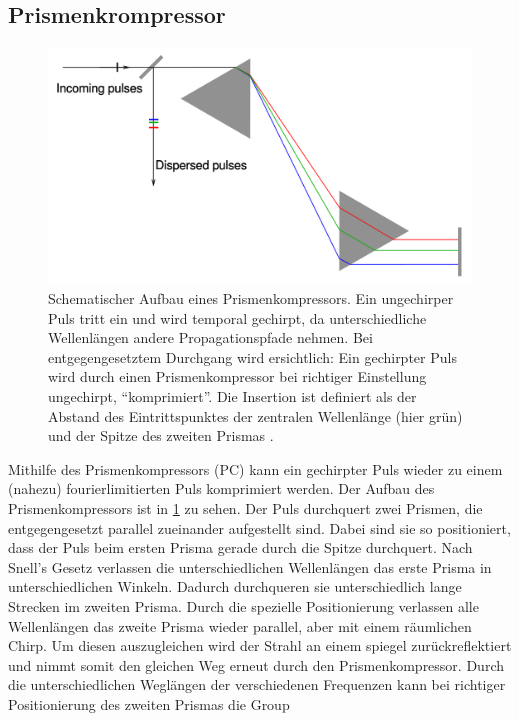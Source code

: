 \documentclass[twoside,        %
               BCOR12mm,       %
               english,ngerman, %
               fleqn,headsepline=false,footsepline=false
              ]{Vorlage/MFPREPORT}
\begin{document}
\subsection{Prismenkrompressor}
\begin{figure}[]
    \centering
    \includegraphics[width=\textwidth]{pc.png}
    \caption{Schematischer Aufbau eines Prismenkompressors. Ein ungechirper
    Puls tritt ein und wird temporal gechirpt, da unterschiedliche Wellenlängen
    andere Propagationspfade nehmen. Bei entgegengesetztem Durchgang wird
    ersichtlich: Ein gechirpter Puls wird durch einen Prismenkompressor bei
    richtiger Einstellung ungechirpt, ``komprimiert''. Die Insertion ist definiert als der
    Abstand des Eintrittspunktes der zentralen Wellenlänge (hier grün) und der
    Spitze des zweiten Prismas .\cite{wikipc}}
    \label{fig:pc}
\end{figure}
Mithilfe des Prismenkompressors (PC) kann ein gechirpter Puls wieder zu einem
(nahezu) fourierlimitierten Puls komprimiert werden. Der Aufbau des
Prismenkompressors ist in \cref{fig:pc} zu sehen. Der Puls durchquert zwei
Prismen, die entgegengesetzt parallel zueinander aufgestellt sind. Dabei sind
sie so positioniert, dass der Puls beim ersten Prisma gerade durch die Spitze
durchquert. Nach Snell's Gesetz verlassen die unterschiedlichen Wellenlängen
das erste Prisma in unterschiedlichen Winkeln. Dadurch durchqueren sie
unterschiedlich lange Strecken im zweiten Prisma. Durch die spezielle
Positionierung verlassen alle Wellenlängen das zweite Prisma wieder parallel,
aber mit einem räumlichen Chirp. Um diesen auszugleichen wird der Strahl an
einem spiegel zurückreflektiert und nimmt somit den gleichen Weg erneut durch
den Prismenkompressor. Durch die unterschiedlichen Weglängen der verschiedenen
Frequenzen kann bei richtiger Positionierung des zweiten Prismas die Group
\end{document}
